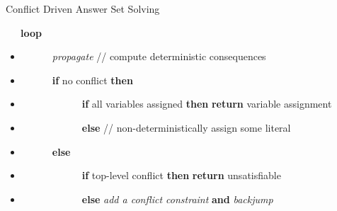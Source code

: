 \begin{block}{Conflict Driven Answer Set Solving}


	\ \ \ \textbf{loop}
	\begin{itemize}
		\item [] \ \ \ \ \ \ \textit{propagate}  
		\hfill// compute deterministic consequences
		\item [] \ \ \ \ \ \ \textbf{if} no conflict \textbf{then}
	\end{itemize}
	\begin{itemize}
		      \item [] \ \ \ \ \ \ \ \ \ \ \ \ \textbf{if} all variables assigned 
		      \textbf{then} 
		      \textbf{return} variable assignment
		      \item []  \ \ \ \ \ \ \ \ \ \ \ \ \textbf{else}
		      \alert{ }
		      \hfill// \alert{non-deterministically assign some literal}
	\end{itemize}
	\begin{itemize}
		\item [] \ \ \ \ \ \ \textbf{else}
	\end{itemize}
	\begin{itemize}
		      \item [] \ \ \ \ \ \ \ \ \ \ \ \ \textbf{if} top-level conflict
		      \textbf{then} 
		      \textbf{return} unsatisfiable
		      \item []  \ \ \ \ \ \ \ \ \ \ \ \ \textbf{else} \textit{add a conflict constraint} \textbf{and} \textit{backjump}
	\end{itemize}





\end{block}
